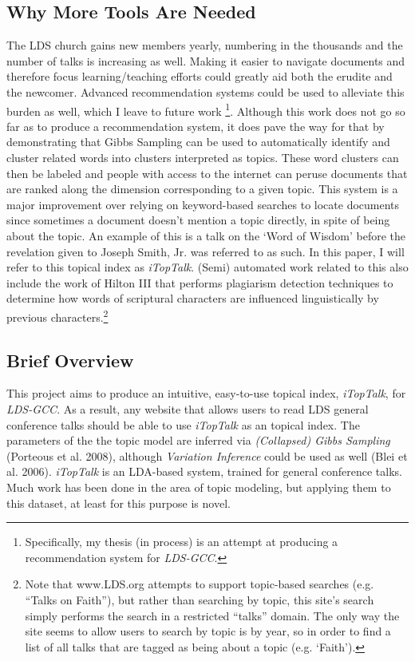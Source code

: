 \subsection{Why More Tools Are Needed}
The LDS church gains new members yearly, numbering in the thousands and the number of talks is increasing as well. Making it easier to navigate documents and therefore focus learning/teaching efforts could greatly aid both the erudite and the newcomer. Advanced recommendation systems could be used to alleviate this burden as well, which I leave to future work \footnote{Specifically, my thesis (in process) is an attempt at producing a recommendation system for \emph{LDS-GCC}.}. Although this work does not go so far as to produce a recommendation system, it does pave the way for that by demonstrating that Gibbs Sampling can be used to automatically identify and cluster related words into clusters interpreted as topics. These word clusters can then be labeled and people with access to the internet can peruse documents that are ranked along the dimension corresponding to a given topic. This system is a major improvement over relying on keyword-based searches to locate documents since sometimes a document doesn't mention a topic directly, in spite of being about the topic. An example of this is a talk on the `Word of Wisdom' before the revelation given to Joseph Smith, Jr. was referred to as such. In this paper, I will refer to this topical index as \emph{iTopTalk}. (Semi) automated  work related to this also include the work of Hilton III  that performs plagiarism detection techniques to determine how words of scriptural characters are influenced linguistically by previous characters.\footnote{Note that www.LDS.org attempts to support topic-based searches (e.g. ``Talks on Faith''), but rather than searching by topic, this site's search simply performs the search in a restricted ``talks'' domain. The only way the site seems to allow users to search by topic is by year, so in order to find a list of all talks that are tagged as being about a topic (e.g. `Faith').}

\subsection{Brief Overview}
This project aims to produce an intuitive, easy-to-use topical index, \emph{iTopTalk}, for \emph{LDS-GCC}. As a result, any website that allows users to read LDS general conference talks should be able to use \emph{iTopTalk} as an topical index. The parameters of the the topic model are inferred via \emph{(Collapsed) Gibbs Sampling}
(Porteous et al. 2008), %
 although \emph{Variation Inference} could be used as well (Blei et al. 2006). %
\emph{iTopTalk} is an LDA-based system, trained for general conference talks. Much work has been done in the area of topic modeling, but applying them to this dataset, at least for this purpose is novel.

